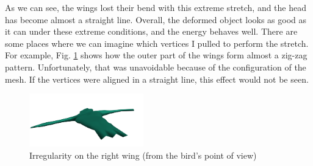 As we can see, the wings lost their bend with this extreme stretch, and the head has become almost a straight line. Overall, the deformed object looks as good as it can under these extreme conditions, and the energy behaves well. There are some places where we can imagine which vertices I pulled to perform the stretch. For example, Fig. \ref{fig:bird_deformed_stretched_zigzag} shows how the outer part of the wings form almost a zig-zag pattern. Unfortunately, that was unavoidable because of the configuration of the mesh. If the vertices were aligned in a straight line, this effect would not be seen.
\begin{figure}[!htbp]
	\centering
	\includegraphics[width=0.44\textwidth]{resources/stretched_zigzag.png}
    \caption{Irregularity on the right wing (from the bird's point of view)}
    \label{fig:bird_deformed_stretched_zigzag}
\end{figure}

